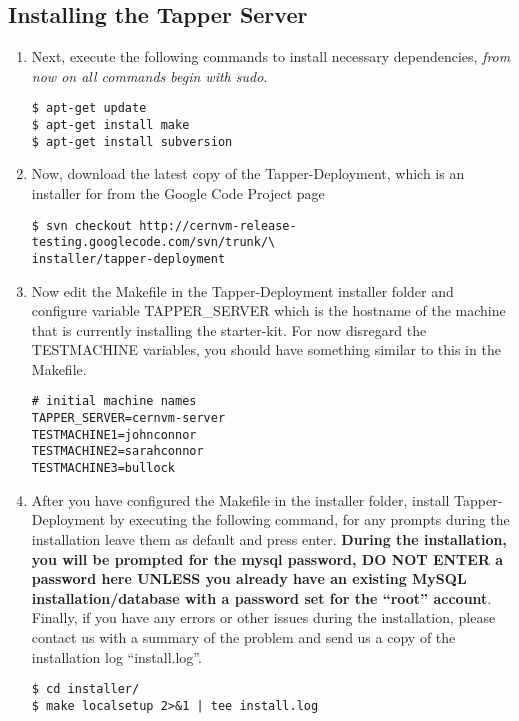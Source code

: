 \subsection{Installing the Tapper Server}
\begin{enumerate}
\item 	Next, execute the following commands to install necessary dependencies, \emph{from now on all commands begin with sudo}.
\lstset{caption= Install Dependencies}
\begin{lstlisting}
$ apt-get update
$ apt-get install make
$ apt-get install subversion
\end{lstlisting}

\item 	Now, download the latest copy of the Tapper-Deployment, which is an installer for \tapper from the \cernvmreleasetesting 
		Google Code Project page
\lstset{caption= Download Tapper-Deployment}
\begin{lstlisting}
$ svn checkout http://cernvm-release-testing.googlecode.com/svn/trunk/\
installer/tapper-deployment
\end{lstlisting}

\item 	Now edit the Makefile in the Tapper-Deployment installer folder and configure variable TAPPER\_SERVER which 
		is the hostname of the machine that is currently installing the starter-kit. For now disregard the TESTMACHINE 
		variables, you should have something similar to this in the Makefile.
\lstset{caption= Makefile Configuration}
\begin{lstlisting}
# initial machine names
TAPPER_SERVER=cernvm-server
TESTMACHINE1=johnconnor
TESTMACHINE2=sarahconnor
TESTMACHINE3=bullock
\end{lstlisting}

\item	After you have configured the Makefile in the installer folder, install Tapper-Deployment by executing the
		following command, for any prompts during the installation leave them as default and press enter. {\bf During
		the installation, you will be prompted for the mysql password, DO NOT ENTER a password here UNLESS you already have an
		existing MySQL installation/database with a password set for the ``root'' account}. Finally, if you have any errors or
		other issues during the installation, please contact us with a summary of the problem and send us a copy of the installation 
		log ``install.log''. 
\lstset{caption= Install Tapper-Deployment}
\begin{lstlisting}
$ cd installer/
$ make localsetup 2>&1 | tee install.log
\end{lstlisting}
\end{enumerate}

